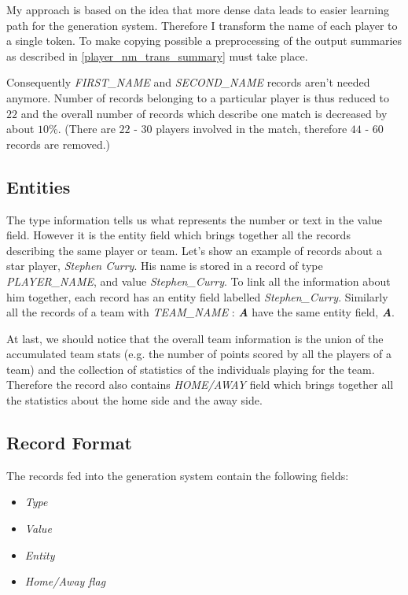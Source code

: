 My approach is based on the idea that more dense data leads to easier learning path for the generation system. Therefore I transform the name of each player to a single token. To make copying possible a preprocessing of the output summaries as described in \ref{player_nm_trans_summary} must take place. 

Consequently \emph{FIRST\_NAME} and \emph{SECOND\_NAME} records aren't needed anymore. Number of records belonging to a particular player is thus reduced to $22$ and the overall number of records which describe one match is decreased by about $10$\%. (There are $22$ - $30$ players involved in the match, therefore $44$ - $60$ records are removed.)

\subsection{Entities}

The type information tells us what represents the number or text in the value field. However it is the entity field which brings together all the records describing the same player or team. Let's show an example of records about a star player, \emph{Stephen Curry}. His name is stored in a record of type \emph{PLAYER\_NAME}, and value \emph{Stephen\_Curry}. To link all the information about him together, each record has an entity field labelled \emph{Stephen\_Curry}. Similarly all the records of a team with \emph{TEAM\_NAME} : \emph{\textbf{A}} have the same entity field, \emph{\textbf{A}}.

At last, we should notice that the overall team information is the union of the accumulated team stats (e.g. the number of points scored by all the players of a team) and the collection of statistics of the individuals playing for the team. Therefore the record also contains \emph{HOME/AWAY} field which brings together all the statistics about the home side and the away side.

\subsection{Record Format}

The records fed into the generation system contain the following fields:

\begin{itemize}
    \item \emph{Type}
    \item \emph{Value}
    \item \emph{Entity}
    \item \emph{Home/Away flag}
\end{itemize}

